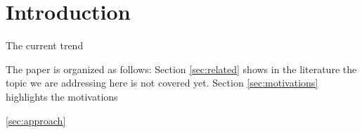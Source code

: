 \section{Introduction}
\label{sec:introduction}


The current trend 

     
 The paper is organized as follows:
Section \ref{sec:related} shows in the literature the topic we are addressing here is not covered yet. Section \ref{sec:motivations} highlights the motivations 

\ref{sec:approach}
 
 
